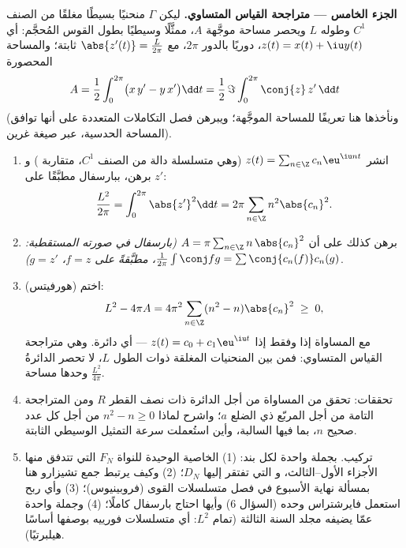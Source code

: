\begin{problem}
\medskip
\noindent\textbf{الجزء الخامس --- متراجحة القياس المتساوي.} ليكن
$\Gamma$ منحنيًا بسيطًا مغلقًا من الصنف $C^1$ وطوله $L$ ويحصر
مساحة موجَّهة $A$، ممثَّلًا وسيطيًا بطول القوس المُحجَّم: أي $z(t) =
x(t) + \iu y(t)$، دوريًا بالدور $2\pi$، مع $\abs{z'(t)} =
\frac{L}{2\pi}$ ثابتة؛ والمساحة المحصورة
\[
A = \frac12\int_0^{2\pi}\bigl(x\,y' - y\,x'\bigr)\dd t
= \frac{1}{2}\,\Im\int_0^{2\pi}\conj{z}\,z'\,\dd t
\]
(ونأخذها هنا تعريفًا للمساحة الموجَّهة؛ ويبرهن فصل
التكاملات المتعددة على أنها توافق المساحة الحدسية،
عبر صيغة غرين).
\begin{enumerate}[resume]
  \item انشر $z(t) = \sum_{n\in\Z}c_n\eu^{\iu nt}$ (وهي
        متسلسلة دالة من الصنف $C^1$، متقاربة ) و
        برهن، ببارسفال مطبَّقًا على $z'$:
        \[
        \frac{L^2}{2\pi} = \int_0^{2\pi}\abs{z'}^2\dd t
        = 2\pi\sum_{n\in\Z}n^2\abs{c_n}^2 .
        \]
  \item برهن كذلك على أن $A = \pi\sum_{n\in\Z}
        n\,\abs{c_n}^2$ \emph{(بارسفال في صورته المستقطبة:
        $\frac{1}{2\pi}\int\conj f g = \sum
        \conj{c_n(f)}c_n(g)$، مطبَّقةً على $f = z$، $g = z'$)}.
  \item (هورفيتس) اختم:
        \[
        L^2 - 4\pi A = 4\pi^2\sum_{n\in\Z}
        (n^2 - n)\abs{c_n}^2 \;\geq\; 0 ,
        \]
        مع المساواة إذا وفقط إذا $z(t) = c_0 +
        c_1\eu^{\iu t}$ --- أي دائرة. وهي متراجحة القياس
        المتساوي: فمن بين المنحنيات المغلقة ذوات الطول $L$، لا تحصر
        الدائرةُ وحدها مساحة $\frac{L^2}{4\pi}$.
  \item تحققات: تحقق من المساواة من أجل الدائرة ذات
        نصف القطر $R$ ومن المتراجحة التامة من أجل المربّع ذي
        الضلع $a$؛ واشرح لماذا $n^2 - n \geq 0$ من أجل كل
        عدد صحيح $n$، بما فيها السالبة، وأين استُعملت
        سرعة التمثيل الوسيطي الثابتة.
  \item تركيب. بجملة واحدة لكل بند: (1) الخاصية الوحيدة
        للنواة $F_N$ التي تتدفق منها الأجزاء الأول--الثالث، و
        التي تفتقر إليها $D_N$؛ (2) وكيف يرتبط جمع تشيزارو هنا
        بمسألة نهاية الأسبوع في فصل متسلسلات القوى
        (فروبينيوس)؛ (3) وأي ربح استعمل
        فايرشتراس وحده (السؤال 6) وأيها احتاج بارسفال
        كاملًا؛ (4) وجملة واحدة عمّا يضيفه مجلد السنة الثالثة
        (تمام $L^2$: أي متسلسلات فورييه بوصفها أساسًا
        هيلبرتيًا).
\end{enumerate}
\end{problem}
